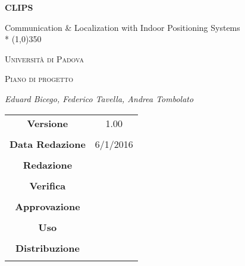 \documentclass[a4paper,12pt]{article}
\author{Eduard Bicego, Federico Tavella, Andrea Tombolato}
\date{05/01/2016}
\begin{document}
\begin{titlepage}
	\centering
	{\huge\bfseries CLIPS\par}
	Communication \& Localization with Indoor Positioning Systems \\*
	\line(1,0){350} \\
	{\scshape\LARGE Università di Padova \par}
	\vspace{1cm}
	{\scshape\Large Piano di progetto\par}
	\vspace{1.5cm}
	
	\vspace{2cm}
	{\Large\itshape Eduard Bicego, Federico Tavella, Andrea Tombolato\par}
	
	\vfill \vfill
	\begin{tabular}{c|c}
		{\hfill \textbf{Versione}} 			& 1.00				\\ \\
		{\hfill\textbf{Data Redazione}} 		& 6/1/2016  		\\ \\
		{\hfill\textbf{Redazione}} 			&  					\\ \\
		{\hfill\textbf{Verifica}} 			&  					\\ \\
		{\hfill\textbf{Approvazione}} 		&  					\\ \\
		{\hfill\textbf{Uso}} 				& 					\\ \\
		{\hfill\textbf{Distribuzione}} 		& 					\\ \\
	\end{tabular}
\end{titlepage}
	
	\newpage

	\tableofcontents 	%
	\listoftables 		%
	
	\label{LastFrontPage}
	

	\newpage
	
	\pagestyle{mymain}
	
	\newpage
		

	\newpage
		
		
	\newpage
			

    \newpage
		
        
    \newpage
		
		
	\label{LastPage}
\end{document}
